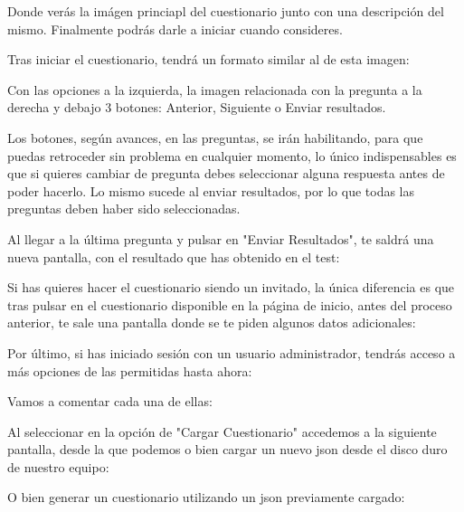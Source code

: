 
Donde verás la imágen princiapl del cuestionario junto con una descripción del mismo. Finalmente podrás darle a iniciar cuando consideres.

Tras iniciar el cuestionario, tendrá un formato similar al de esta imagen:


Con las opciones a la izquierda, la imagen relacionada con la pregunta a la derecha y debajo 3 botones: Anterior, Siguiente o Enviar resultados.

Los botones, según avances, en las preguntas, se irán habilitando, para que puedas retroceder sin problema en cualquier momento, lo único indispensables es que si quieres cambiar de pregunta debes seleccionar alguna respuesta antes de poder hacerlo. Lo mismo sucede al enviar resultados, por lo que todas las preguntas deben haber sido seleccionadas.

Al llegar a la última pregunta y pulsar en "Enviar Resultados", te saldrá una nueva pantalla, con el resultado que has obtenido en el test:


Si has quieres hacer el cuestionario siendo un invitado, la única diferencia es que tras pulsar en el cuestionario disponible en la página de inicio, antes del proceso anterior, te sale una pantalla donde se te piden algunos datos adicionales:


Por último, si has iniciado sesión con un usuario administrador, tendrás acceso a más opciones de las permitidas hasta ahora:


Vamos a comentar cada una de ellas:

Al seleccionar en la opción de "Cargar Cuestionario" accedemos a la siguiente pantalla, desde la que podemos o bien cargar un nuevo json desde el disco duro de nuestro equipo:


O bien generar un cuestionario utilizando un json previamente cargado:


